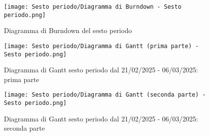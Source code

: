 \newpage
\begin{figure}[h] 
    \centering
    \texttt{[image: Sesto periodo/Diagramma di Burndown - Sesto periodo.png]}
    \caption{Diagramma di Burndown del sesto periodo} 
    \label{fig: Diagramma di Burndown del sesto periodo}
\end{figure}
\newpage
\begin{figure}[h] 
    \centering
    \texttt{[image: Sesto periodo/Diagramma di Gantt (prima parte) - Sesto periodo.png]}
    \caption{Diagramma di Gantt sesto periodo dal 21/02/2025 - 06/03/2025: prima parte} 
    \label{fig: Diagramma di Gantt sesto periodo dal 21/02/2025 - 06/03/2025: prima parte}
\end{figure}
\newpage
\begin{figure}[h] 
    \centering
    \texttt{[image: Sesto periodo/Diagramma di Gantt (seconda parte) - Sesto periodo.png]}
    \caption{Diagramma di Gantt sesto periodo dal 21/02/2025 - 06/03/2025: seconda parte} 
    \label{fig: Diagramma di Gantt sesto periodo dal 21/02/2025 - 06/03/2025: seconda parte}
\end{figure}

\newpage


